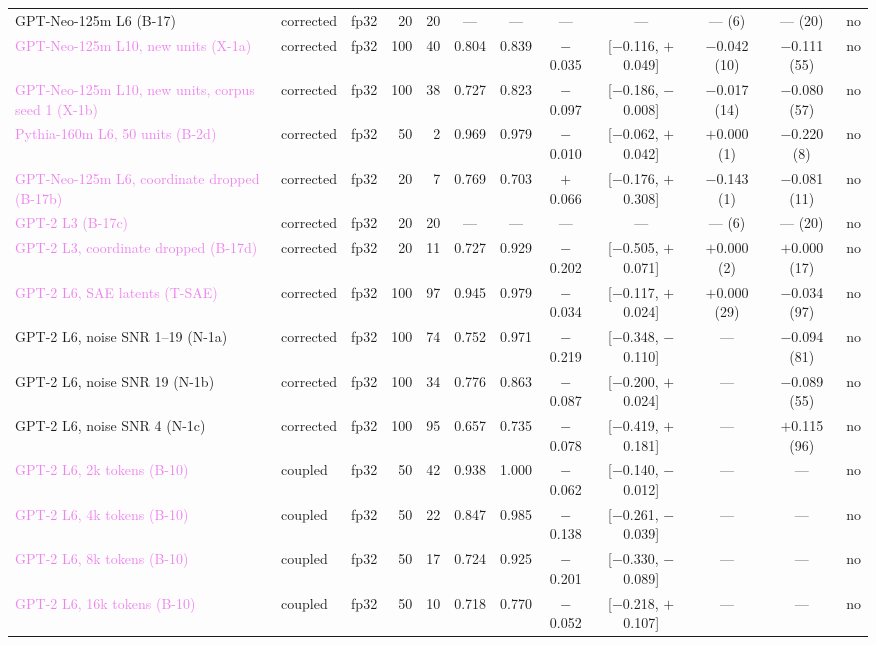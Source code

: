 \documentclass[10pt]{article}
\newcommand{\draft}[1]{\textcolor{violet}{#1}}
\begin{document}
\begin{table}[h]
{\begin{tabular}{lllrrccccccc}
GPT-Neo-125m L6 (B-17) & corrected & fp32 & 20 & 20 & --- & --- & --- & --- & --- (6) & --- (20) & no \\
\draft{GPT-Neo-125m L10, new units (X-1a)} & corrected & fp32 & 100 & 40 & 0.804 & 0.839 & $-$0.035 & [$-$0.116, $+$0.049] & $-$0.042 (10) & $-$0.111 (55) & no \\
\draft{GPT-Neo-125m L10, new units, corpus seed 1 (X-1b)} & corrected & fp32 & 100 & 38 & 0.727 & 0.823 & $-$0.097 & [$-$0.186, $-$0.008] & $-$0.017 (14) & $-$0.080 (57) & no \\
\draft{Pythia-160m L6, 50 units (B-2d)} & corrected & fp32 & 50 & 2 & 0.969 & 0.979 & $-$0.010 & [$-$0.062, $+$0.042] & $+$0.000 (1) & $-$0.220 (8) & no \\
\draft{GPT-Neo-125m L6, coordinate dropped (B-17b)} & corrected & fp32 & 20 & 7 & 0.769 & 0.703 & $+$0.066 & [$-$0.176, $+$0.308] & $-$0.143 (1) & $-$0.081 (11) & no \\
\draft{GPT-2 L3 (B-17c)} & corrected & fp32 & 20 & 20 & --- & --- & --- & --- & --- (6) & --- (20) & no \\
\draft{GPT-2 L3, coordinate dropped (B-17d)} & corrected & fp32 & 20 & 11 & 0.727 & 0.929 & $-$0.202 & [$-$0.505, $+$0.071] & $+$0.000 (2) & $+$0.000 (17) & no \\
\draft{GPT-2 L6, SAE latents (T-SAE)} & corrected & fp32 & 100 & 97 & 0.945 & 0.979 & $-$0.034 & [$-$0.117, $+$0.024] & $+$0.000 (29) & $-$0.034 (97) & no \\
GPT-2 L6, noise SNR 1--19 (N-1a) & corrected & fp32 & 100 & 74 & 0.752 & 0.971 & $-$0.219 & [$-$0.348, $-$0.110] & --- & $-$0.094 (81) & no \\
GPT-2 L6, noise SNR 19 (N-1b) & corrected & fp32 & 100 & 34 & 0.776 & 0.863 & $-$0.087 & [$-$0.200, $+$0.024] & --- & $-$0.089 (55) & no \\
GPT-2 L6, noise SNR 4 (N-1c) & corrected & fp32 & 100 & 95 & 0.657 & 0.735 & $-$0.078 & [$-$0.419, $+$0.181] & --- & $+$0.115 (96) & no \\
\draft{GPT-2 L6, 2k tokens (B-10)} & coupled & fp32 & 50 & 42 & 0.938 & 1.000 & $-$0.062 & [$-$0.140, $-$0.012] & --- & --- & no \\
\draft{GPT-2 L6, 4k tokens (B-10)} & coupled & fp32 & 50 & 22 & 0.847 & 0.985 & $-$0.138 & [$-$0.261, $-$0.039] & --- & --- & no \\
\draft{GPT-2 L6, 8k tokens (B-10)} & coupled & fp32 & 50 & 17 & 0.724 & 0.925 & $-$0.201 & [$-$0.330, $-$0.089] & --- & --- & no \\
\draft{GPT-2 L6, 16k tokens (B-10)} & coupled & fp32 & 50 & 10 & 0.718 & 0.770 & $-$0.052 & [$-$0.218, $+$0.107] & --- & --- & no \\
\bottomrule
\end{tabular}}
\end{table}
\end{document}
